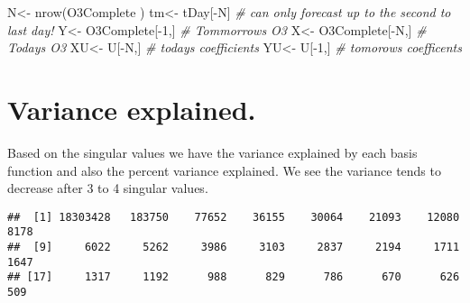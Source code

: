 \documentclass[
]{article}
\newenvironment{Shaded}{\begin{snugshade}}{\end{snugshade}}
\newcommand{\CommentTok}[1]{\textcolor[rgb]{0.56,0.35,0.01}{\textit{#1}}}
\newcommand{\DecValTok}[1]{\textcolor[rgb]{0.00,0.00,0.81}{#1}}
\newcommand{\FunctionTok}[1]{\textcolor[rgb]{0.00,0.00,0.00}{#1}}
\newcommand{\NormalTok}[1]{#1}
\newcommand{\OtherTok}[1]{\textcolor[rgb]{0.56,0.35,0.01}{#1}}
\newcommand{\SpecialCharTok}[1]{\textcolor[rgb]{0.00,0.00,0.00}{#1}}
\begin{document}
\begin{Shaded}
\begin{Highlighting}[]
\NormalTok{N}\OtherTok{\textless{}{-}} \FunctionTok{nrow}\NormalTok{(O3Complete )}
\NormalTok{tm}\OtherTok{\textless{}{-}}\NormalTok{ tDay[}\SpecialCharTok{{-}}\NormalTok{N] }\CommentTok{\# can only forecast up to the second to last day!}
\NormalTok{Y}\OtherTok{\textless{}{-}}\NormalTok{ O3Complete[}\SpecialCharTok{{-}}\DecValTok{1}\NormalTok{,] }\CommentTok{\# Tommorrows O3}
\NormalTok{X}\OtherTok{\textless{}{-}}\NormalTok{  O3Complete[}\SpecialCharTok{{-}}\NormalTok{N,] }\CommentTok{\# Todays O3}
\NormalTok{XU}\OtherTok{\textless{}{-}}\NormalTok{ U[}\SpecialCharTok{{-}}\NormalTok{N,] }\CommentTok{\# todays coefficients}
\NormalTok{YU}\OtherTok{\textless{}{-}}\NormalTok{ U[}\SpecialCharTok{{-}}\DecValTok{1}\NormalTok{,] }\CommentTok{\# tomorows coefficents}
\end{Highlighting}
\end{Shaded}

\hypertarget{variance-explained.}{%
\section{Variance explained.}\label{variance-explained.}}

Based on the singular values we have the variance explained by each
basis function and also the percent variance explained. We see the
variance tends to decrease after 3 to 4 singular values.

\begin{Shaded}
\end{Shaded}

\begin{verbatim}
##  [1] 18303428   183750    77652    36155    30064    21093    12080     8178
##  [9]     6022     5262     3986     3103     2837     2194     1711     1647
## [17]     1317     1192      988      829      786      670      626      509
\end{verbatim}

\begin{Shaded}
\end{Shaded}
\end{document}
